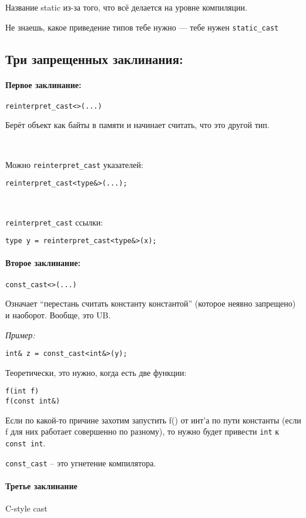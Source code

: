 \documentclass[12pt]{article}
\begin{document}
Название static из-за того, что всё делается на уровне компиляции. 

Не знаешь, какое приведение типов тебе нужно --- тебе нужен \texttt{static\_cast} 

\subsection{Три запрещенных заклинания:}

\paragraph{Первое заклинание:} \texttt{reinterpret\_cast<>(...)}

Берёт объект как байты в памяти и начинает считать, что это другой тип. 

\

Можно \texttt{reinterpret\_cast} указателей:

\texttt{reinterpret\_cast<type\&>(...);}

\

\texttt{reinterpret\_cast} ссылки:

\texttt{type y = reinterpret\_cast<type\&>(x);}

\paragraph{Второе заклинание:} \texttt{const\_cast<>(...)}

Означает ``перестань считать константу константой'' (которое неявно запрещено) и наоборот. Вообще, это UB. 

\textit{Пример:}

\begin{lstlisting}
int& z = const_cast<int&>(y);	
\end{lstlisting}

Теоретически, это нужно, когда есть две функции:

\begin{lstlisting}
f(int f)
f(const int&)
\end{lstlisting}

Если по какой-то причине захотим запустить f() от инт'а по пути константы (если f для них работает совершенно по разному), то нужно будет привести \texttt{int} к \texttt{const int}. 

\texttt{const\_cast} -- это угнетение компилятора.

\paragraph{Третье заклинание} C-style cast
\end{document}
